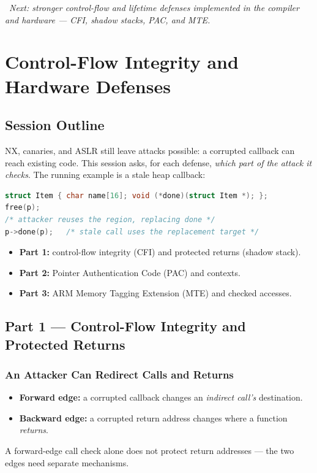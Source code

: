 \documentclass[hidelinks]{article}
\newcommand{\callout}[1]{\par\smallskip\noindent{\color{capri}$\blacktriangleright$}\ \textit{#1}\par\smallskip}
\begin{document}
\callout{Next: stronger control-flow and lifetime defenses implemented in the compiler and hardware --- CFI, shadow stacks, PAC, and MTE.}

\newpage
\section{Control-Flow Integrity and Hardware Defenses}

\subsection{Session Outline}

NX, canaries, and ASLR still leave attacks possible: a corrupted callback can reach existing code. This session asks, for each defense, \emph{which part of the attack it checks}. The running example is a stale heap callback:
\begin{lstlisting}[language=C]
struct Item { char name[16]; void (*done)(struct Item *); };
free(p);
/* attacker reuses the region, replacing done */
p->done(p);   /* stale call uses the replacement target */
\end{lstlisting}
\begin{itemize}
    \item \textbf{Part 1:} control-flow integrity (CFI) and protected returns (shadow stack).
    \item \textbf{Part 2:} Pointer Authentication Code (PAC) and contexts.
    \item \textbf{Part 3:} ARM Memory Tagging Extension (MTE) and checked accesses.
\end{itemize}

\subsection{Part 1 --- Control-Flow Integrity and Protected Returns}

\subsubsection{An Attacker Can Redirect Calls and Returns}

\begin{itemize}
    \item \textbf{Forward edge:} a corrupted callback changes an \emph{indirect call's} destination.
    \item \textbf{Backward edge:} a corrupted return address changes where a function \emph{returns}.
\end{itemize}
A forward-edge call check alone does not protect return addresses --- the two edges need separate mechanisms.
\end{document}
